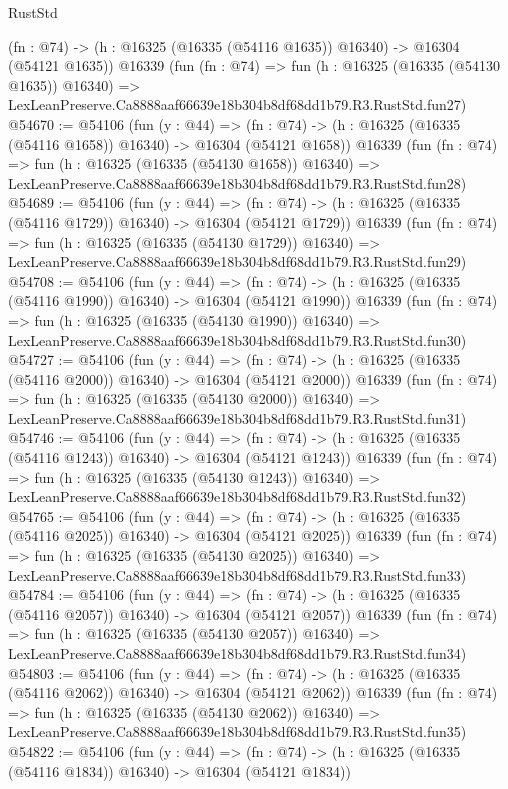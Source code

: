\begin{lexlean}{RustStd}
\begin{coremodule}
    (fn : @74) -> (h : @16325 (@16335 (@54116 @1635)) @16340) -> @16304 (@54121 @1635))
    @16339
    (fun (fn : @74) =>
    fun (h : @16325 (@16335 (@54130 @1635)) @16340) =>
    LexLeanPreserve.Ca8888aaf66639e18b304b8df68dd1b79.R3.RustStd.fun27)
@54670 := @54106
    (fun (y : @44) =>
    (fn : @74) -> (h : @16325 (@16335 (@54116 @1658)) @16340) -> @16304 (@54121 @1658))
    @16339
    (fun (fn : @74) =>
    fun (h : @16325 (@16335 (@54130 @1658)) @16340) =>
    LexLeanPreserve.Ca8888aaf66639e18b304b8df68dd1b79.R3.RustStd.fun28)
@54689 := @54106
    (fun (y : @44) =>
    (fn : @74) -> (h : @16325 (@16335 (@54116 @1729)) @16340) -> @16304 (@54121 @1729))
    @16339
    (fun (fn : @74) =>
    fun (h : @16325 (@16335 (@54130 @1729)) @16340) =>
    LexLeanPreserve.Ca8888aaf66639e18b304b8df68dd1b79.R3.RustStd.fun29)
@54708 := @54106
    (fun (y : @44) =>
    (fn : @74) -> (h : @16325 (@16335 (@54116 @1990)) @16340) -> @16304 (@54121 @1990))
    @16339
    (fun (fn : @74) =>
    fun (h : @16325 (@16335 (@54130 @1990)) @16340) =>
    LexLeanPreserve.Ca8888aaf66639e18b304b8df68dd1b79.R3.RustStd.fun30)
@54727 := @54106
    (fun (y : @44) =>
    (fn : @74) -> (h : @16325 (@16335 (@54116 @2000)) @16340) -> @16304 (@54121 @2000))
    @16339
    (fun (fn : @74) =>
    fun (h : @16325 (@16335 (@54130 @2000)) @16340) =>
    LexLeanPreserve.Ca8888aaf66639e18b304b8df68dd1b79.R3.RustStd.fun31)
@54746 := @54106
    (fun (y : @44) =>
    (fn : @74) -> (h : @16325 (@16335 (@54116 @1243)) @16340) -> @16304 (@54121 @1243))
    @16339
    (fun (fn : @74) =>
    fun (h : @16325 (@16335 (@54130 @1243)) @16340) =>
    LexLeanPreserve.Ca8888aaf66639e18b304b8df68dd1b79.R3.RustStd.fun32)
@54765 := @54106
    (fun (y : @44) =>
    (fn : @74) -> (h : @16325 (@16335 (@54116 @2025)) @16340) -> @16304 (@54121 @2025))
    @16339
    (fun (fn : @74) =>
    fun (h : @16325 (@16335 (@54130 @2025)) @16340) =>
    LexLeanPreserve.Ca8888aaf66639e18b304b8df68dd1b79.R3.RustStd.fun33)
@54784 := @54106
    (fun (y : @44) =>
    (fn : @74) -> (h : @16325 (@16335 (@54116 @2057)) @16340) -> @16304 (@54121 @2057))
    @16339
    (fun (fn : @74) =>
    fun (h : @16325 (@16335 (@54130 @2057)) @16340) =>
    LexLeanPreserve.Ca8888aaf66639e18b304b8df68dd1b79.R3.RustStd.fun34)
@54803 := @54106
    (fun (y : @44) =>
    (fn : @74) -> (h : @16325 (@16335 (@54116 @2062)) @16340) -> @16304 (@54121 @2062))
    @16339
    (fun (fn : @74) =>
    fun (h : @16325 (@16335 (@54130 @2062)) @16340) =>
    LexLeanPreserve.Ca8888aaf66639e18b304b8df68dd1b79.R3.RustStd.fun35)
@54822 := @54106
    (fun (y : @44) =>
    (fn : @74) -> (h : @16325 (@16335 (@54116 @1834)) @16340) -> @16304 (@54121 @1834))

\end{coremodule}
\end{lexlean}
